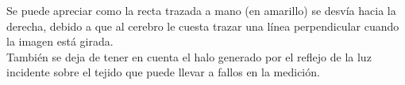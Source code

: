 Se puede apreciar como la recta trazada a mano (en amarillo) se desvía 
hacia la derecha, debido a que al cerebro le cuesta trazar una línea
perpendicular cuando la imagen está girada.\\
También se deja de tener en cuenta el halo generado por el reflejo de la luz
incidente sobre el tejido que puede llevar a fallos en la medición.

